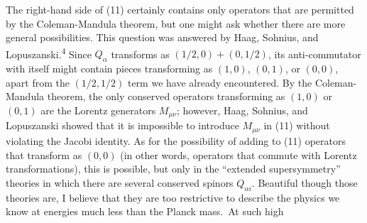The right-hand side of (11) certainly contains only operators
that are permitted by the Coleman-Mandula theorem, but one might ask
whether there are more general possibilities. This question was
answered by Haag, Sohnius, and Lopuszanski.\textsuperscript{4} Since $Q_\alpha$ transforms as
$(1/2,0) + (0,1/2)$, its anti-commutator with itself might contain
pieces transforming as $(1,0)$, $(0,1)$, or $(0,0)$, apart from the
$(1/2,1/2)$ term we have already encountered. By the Coleman-Mandula
theorem, the only conserved operators transforming as $(1,0)$ or $(0,1)$
are the Lorentz generators $M_{\mu\nu}$; however, Haag, Sohnius, and Lopuszanski
showed that it is impossible to introduce $M_{\mu\nu}$ in (11) without
violating the Jacobi identity. As for the possibility of adding to
(11) operators that transform as $(0,0)$ (in other words, operators
that commute with Lorentz transformations), this is possible, but
only in the ``extended supersymmetry'' theories in which there are
several conserved spinors $Q_{\alpha i}$. Beautiful though those theories are,
I believe that they are too restrictive to describe the physics we
know at energies much less than the Planck mass.\begingroup\renewcommand{\thefootnote}{\fnsymbol{footnote}}\footnotemark[1]\endgroup\ At such high

\begingroup
\renewcommand{\thefootnote}{\fnsymbol{footnote}}
\endgroup
